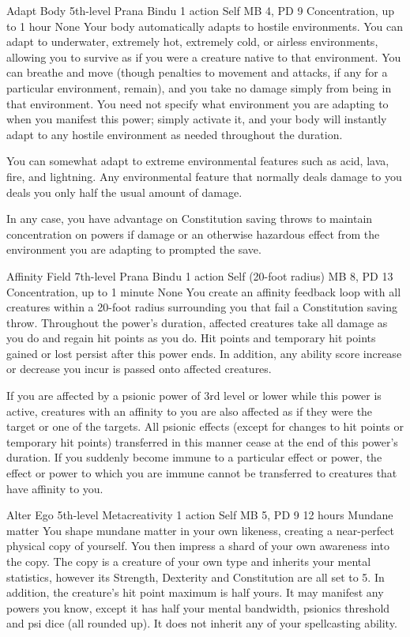 \DndPowerHeader%
    {Adapt Body\label{pwr:adapt-body}}
    {5th-level Prana Bindu}
    {1 action}
    {Self}
    {MB 4, PD 9}
    {Concentration, up to 1 hour}
    {None}
Your body automatically adapts to hostile
environments. You can adapt to underwater, extremely hot,
extremely cold, or airless environments, allowing you to survive
as if you were a creature native to that environment. You
can breathe and move (though penalties to movement and attacks,
if any for a particular environment, remain), and you take
no damage simply from being in that environment. You need
not specify what environment you are adapting to when you
manifest this power; simply activate it, and your body will
instantly adapt to any hostile environment as needed throughout
the duration.

You can somewhat adapt to extreme environmental features such
as acid, lava, fire, and lightning. Any environmental feature
that normally deals damage to you deals
you only half the usual amount of damage.

In any case, you have advantage on Constitution saving throws
to maintain concentration on powers if damage or an otherwise
hazardous effect from the environment you are adapting to
prompted the save.

\DndPowerHeader%
    {Affinity Field\label{pwr:affinity-field}}
    {7th-level Prana Bindu}
    {1 action}
    {Self (20-foot radius)}
    {MB 8, PD 13}
    {Concentration, up to 1 minute}
    {None}
You create an affinity feedback loop with all creatures within a 20-foot
radius surrounding you that fail a Constitution saving throw.
Throughout the power's duration, affected creatures take all damage
as you do and regain hit points as you do.
Hit points and temporary hit points gained or lost persist after this power ends.
In addition, any ability score increase or decrease you incur is passed
onto affected creatures.

If you are affected by a psionic power of 3rd level or lower while this power is active,
creatures with an affinity to you are also affected
as if they were the target or one of the targets.
All psionic effects (except for changes to hit points or temporary hit points)
transferred in this manner cease at the end of this power's duration.
If you suddenly become immune to a particular effect or power,
the effect or power to which you are immune cannot be transferred
to creatures that have affinity to you.

\DndPowerHeader%
    {Alter Ego\label{pwr:alter-ego}}
    {5th-level Metacreativity}
    {1 action}
    {Self}
    {MB 5, PD 9}
    {12 hours}
    {Mundane matter}
You shape mundane matter in your own likeness, creating a
near-perfect physical copy of yourself.
You then impress a shard of your own awareness into the copy.
The copy is a creature of your own type and inherits your mental statistics,
however its Strength, Dexterity and Constitution are all set to 5.
In addition, the creature's hit point maximum is half yours.
It may manifest any powers you know, except it has half your
mental bandwidth, psionics threshold and psi dice (all rounded up).
It does not inherit any of your spellcasting ability.


